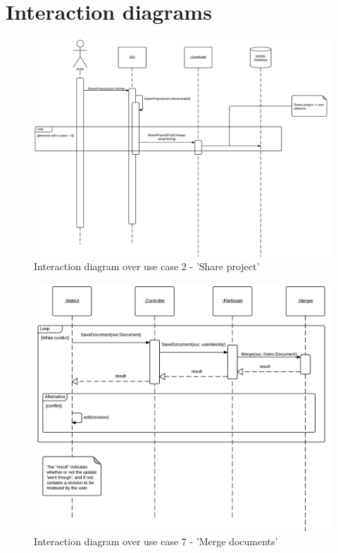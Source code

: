 \section{Interaction diagrams}
\label{sec:interaction-diagram-appendix}

\begin{figure}[htb]
    \centering
    \includegraphics[width=1\textwidth]{Software_design/graphics/usecase2.png}
    \caption{Interaction diagram over use case 2 - 'Share project'}
    \label{fig:uc2-interaction-diagram}
\end{figure}

\begin{figure}[hbt]
    \centering
    \includegraphics[width=1\textwidth]{Software_design/graphics/usecase7.png}
    \caption{Interaction diagram over use case 7 - 'Merge documents'}
    \label{fig:uc7-interaction-diagram}
\end{figure}
